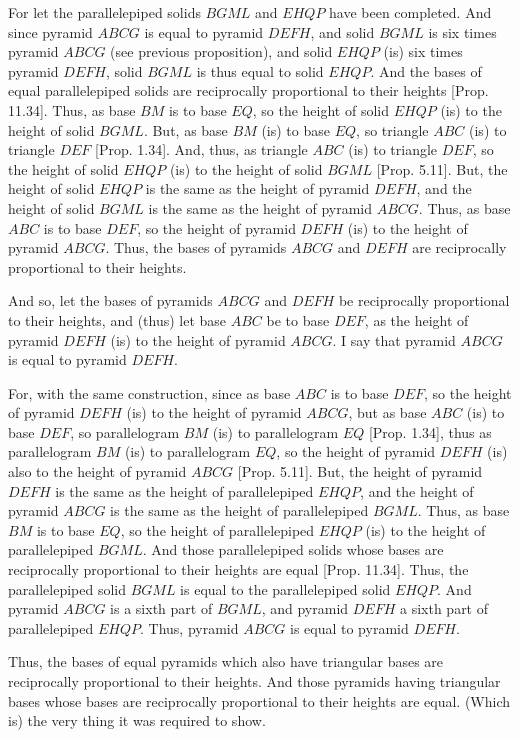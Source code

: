 \begin{Parallel}{}{}
{For let the parallelepiped solids $BGML$ and $EHQP$ have been completed. And since pyramid
$ABCG$ is equal to pyramid $DEFH$, and solid $BGML$ is six times pyramid $ABCG$ (see previous
proposition), and solid $EHQP$ (is) six times pyramid $DEFH$, solid $BGML$ is thus equal to
solid $EHQP$. And the bases of equal parallelepiped solids are reciprocally proportional
to their heights [Prop. 11.34]. Thus, as base $BM$ is to base $EQ$, so the height of
solid $EHQP$ (is) to the height of solid $BGML$. But, as base $BM$ (is) to base $EQ$, so triangle
$ABC$ (is) to triangle $DEF$ [Prop. 1.34]. And, thus, as triangle $ABC$ (is) to triangle
$DEF$, so the height of solid $EHQP$ (is) to the height of solid $BGML$ [Prop. 5.11]. But, the height of
solid $EHQP$ is the same as the height of pyramid $DEFH$, and the height of solid $BGML$ is the
same as the height of pyramid $ABCG$. Thus, as base $ABC$ is to base $DEF$, so the
height of pyramid $DEFH$ (is) to the height of pyramid $ABCG$. Thus, the bases of pyramids
$ABCG$ and $DEFH$ are reciprocally proportional to their heights.

And so, let the bases of pyramids $ABCG$ and $DEFH$ be reciprocally proportional to their heights, and (thus) let
base $ABC$ be to base $DEF$, as the height of pyramid $DEFH$ (is) to the height of pyramid $ABCG$.
I say that pyramid $ABCG$ is equal to pyramid $DEFH$.

For, with the same construction, since as base $ABC$ is to base $DEF$, so the height of pyramid $DEFH$ (is)
to the height of pyramid $ABCG$, but as base $ABC$ (is) to base $DEF$, so parallelogram $BM$ (is)
to parallelogram $EQ$ [Prop. 1.34], thus as parallelogram $BM$ (is) to
parallelogram $EQ$, so the height of pyramid $DEFH$  (is) also to the height of pyramid $ABCG$ [Prop. 5.11]. But, 
the height of pyramid $DEFH$ is the same as the height of parallelepiped $EHQP$, and the height of
pyramid $ABCG$ is the same as the height of parallelepiped $BGML$. Thus, as base $BM$ is to
base $EQ$, so the height of parallelepiped $EHQP$ (is) to the height of parallelepiped $BGML$.
And those parallelepiped solids whose bases are reciprocally proportional to their
heights are equal [Prop. 11.34]. Thus, the parallelepiped solid $BGML$ is equal to the parallelepiped
solid $EHQP$. And pyramid $ABCG$ is a sixth part of $BGML$, and pyramid $DEFH$ a sixth part of
parallelepiped $EHQP$. Thus, pyramid $ABCG$ is equal to pyramid $DEFH$.

Thus,  the bases of equal pyramids which also have triangular bases are reciprocally
proportional to their heights. And those pyramids having triangular bases whose bases are reciprocally
proportional to their heights  are equal. (Which is) the very thing it was required to show.}
\end{Parallel}


